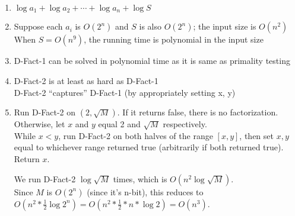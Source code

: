 \documentclass[11pt]{article}
\begin{document}
\begin{enumerate}
    \item $\log{a_1} + \log{a_2} + \cdots + \log{a_n} + \log{S}$
    \item 
    Suppose each $a_i$ is $O(2^n)$ and $S$ is also $O(2^n)$; the input size is $O(n^2)$\\
    When $S = O(n^9)$, the running time is polynomial in the input size
    \item D-Fact-1 can be solved in polynomial time as it is same as primality testing
    \item 
    D-Fact-2 is at least as hard as D-Fact-1\\
    D-Fact-2 ``captures'' D-Fact-1 (by appropriately setting x, y)
    \item 
    Run D-Fact-2 on $(2, \sqrt{M})$. If it returns false, there is no factorization.\\
    Otherwise, let $x$ and $y$ equal 2 and $\sqrt{M}$ respectively.\\
    While $x < y$, run D-Fact-2 on both halves of the range $[x,y]$, then set $x, y$ equal to whichever range returned true (arbitrarily if both returned true).\\
    Return $x$.

    We run D-Fact-2 $\log{\sqrt{M}}$ times, which is $O(n^2 \log{\sqrt{M}})$.\\
    Since $M$ is $O(2^n)$ (since it's n-bit), this reduces to $O(n^2 * \frac{1}{2} \log{2^n}) = O(n^2 * \frac{1}{2} * n * \log{2}) = O(n^3)$.
\end{enumerate}
\end{document}

